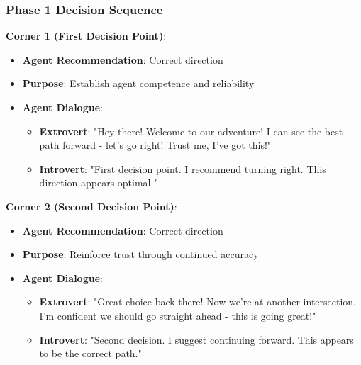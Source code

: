 \documentclass[12pt]{article}
\begin{document}
\subsubsection{Phase 1 Decision Sequence}

\textbf{Corner 1 (First Decision Point)}:
\begin{itemize}
    \item \textbf{Agent Recommendation}: Correct direction
    \item \textbf{Purpose}: Establish agent competence and reliability
    \item \textbf{Agent Dialogue}: 
    \begin{itemize}
        \item \textbf{Extrovert}: "Hey there! Welcome to our adventure! I can see the best path forward - let's go right! Trust me, I've got this!"
        \item \textbf{Introvert}: "First decision point. I recommend turning right. This direction appears optimal."
    \end{itemize}
\end{itemize}

\textbf{Corner 2 (Second Decision Point)}:
\begin{itemize}
    \item \textbf{Agent Recommendation}: Correct direction
    \item \textbf{Purpose}: Reinforce trust through continued accuracy
    \item \textbf{Agent Dialogue}:
    \begin{itemize}
        \item \textbf{Extrovert}: "Great choice back there! Now we're at another intersection. I'm confident we should go straight ahead - this is going great!"
        \item \textbf{Introvert}: "Second decision. I suggest continuing forward. This appears to be the correct path."
    \end{itemize}
\end{itemize}
\end{document}
